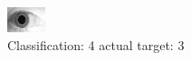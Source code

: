 \begin{figure}[h!]
\begin{center}
\includegraphics[width=0.60\columnwidth]{figures/ID1922_class_4_target_3.png}
\end{center}
\caption{ Classification: 4 actual target: 3}
\label{fig:ID1922_class_4_target_3}
\end{figure}

